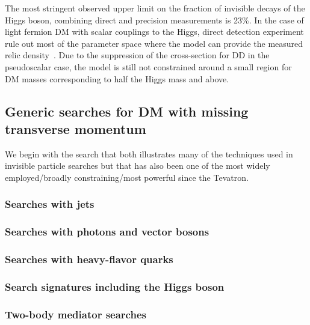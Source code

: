 The most stringent observed upper limit on the fraction of invisible decays of the Higgs boson, combining direct and precision measurements is 23\%.
In the case of light fermion DM with scalar couplings to the Higgs, direct detection experiment rule out most of the parameter space where the model can provide the measured relic density~\cite{Escudero:2016gzx,Djouadi:2011aa}. Due to the suppression of the cross-section for DD in the pseudoscalar case, the model is still not constrained around a small region for DM masses corresponding to half the Higgs mass and above. %

\subsection{Generic searches for DM with missing transverse momentum}
\label{sec:results_monoXSearches}

We begin with the search that both illustrates many of the techniques used in invisible particle searches but that has also been one of the most widely employed/broadly constraining/most powerful since the Tevatron. 

\subsubsection{Searches with jets}

\subsubsection{Searches with photons and vector bosons}



\subsubsection{Searches with heavy-flavor quarks}

\subsubsection{Search signatures including the Higgs boson}

\subsubsection{Two-body mediator searches}


